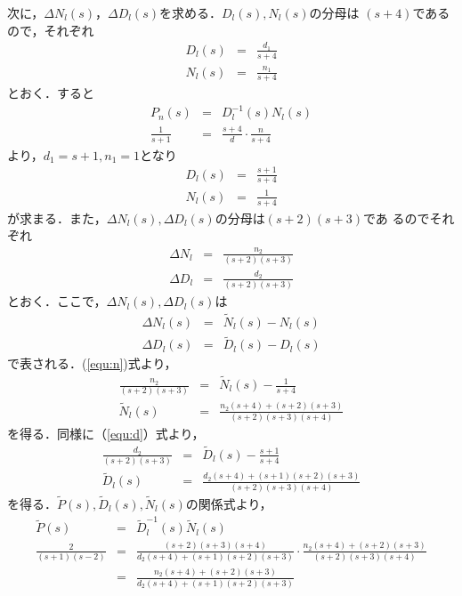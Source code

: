 \documentclass[a4paper,12pt]{jarticle}
\begin{document}
次に，$\Delta N_l(s)$，$\Delta D_l(s)$を求める．$D_l(s),N_l(s)$の分母は
$(s+4)$であるので，それぞれ
%
\begin{eqnarray}
 D_l(s)&=&\frac{d_1}{s+4} \\
 N_l(s)&=&\frac{n_1}{s+4}
\end{eqnarray}
%
とおく．すると
%
\begin{eqnarray}
 P_n(s) &=& D_l^{-1}(s)N_l(s) \\
 \frac{1}{s+1} &=& \frac{s+4}{d}\cdot \frac{n}{s+4} 
\end{eqnarray}
%
より，$d_1=s+1,n_1=1$となり
%
\begin{eqnarray}
 D_l(s) &=& \frac{s+1}{s+4} \\
 N_l(s) &=& \frac{1}{s+4}
\end{eqnarray}
%
が求まる．また，$\Delta N_l(s),\Delta D_l(s)$の分母は$(s+2)(s+3)$であ
るのでそれぞれ
%
\begin{eqnarray}
 \Delta N_l &=& \frac{n_2}{(s+2)(s+3)} \\
 \Delta D_l &=& \frac{d_2}{(s+2)(s+3)}
\end{eqnarray}
%
とおく．ここで，$\Delta N_l(s),\Delta D_l(s)$は
%
\begin{eqnarray}
 \Delta N_l(s) &=& \tilde{N}_l(s) -N_l(s) \label{equ:n} \\
 \Delta D_l(s) &=& \tilde{D}_l(s) -D_l(s) \label{equ:d}
\end{eqnarray}
%
で表される．(\ref{equ:n})式より，
%
\begin{eqnarray}
 \frac{n_2}{(s+2)(s+3)} &=& \tilde{N}_l(s) - \frac{1}{s+4} \nonumber \\
 \tilde{N}_l(s) &=& \frac{n_2(s+4)+(s+2)(s+3)}{(s+2)(s+3)(s+4)} 
\end{eqnarray}
%
を得る．同様に（\ref{equ:d}）式より，
%
\begin{eqnarray}
 \frac{d_2}{(s+2)(s+3)} &=& \tilde{D}_l(s) - \frac{s+1}{s+4} \nonumber \\
 \tilde{D}_l(s) &=& \frac{d_2(s+4)+(s+1)(s+2)(s+3)}{(s+2)(s+3)(s+4)} 
\end{eqnarray}
%
を得る．$\tilde{P}(s),\tilde{D}_l(s),\tilde{N}_l(s)$の関係式より，
%
\begin{eqnarray}
 \tilde{P}(s) &=& \tilde{D}_l^{-1}(s)\tilde{N}_l(s) \\
 \frac{2}{(s+1)(s-2)} &=&
  \frac{(s+2)(s+3)(s+4)}{d_2(s+4)+(s+1)(s+2)(s+3)} \cdot
  \frac{n_2(s+4)+(s+2)(s+3)}{(s+2)(s+3)(s+4)} \nonumber\\
 &=&\frac{n_2(s+4)+(s+2)(s+3)}{d_2(s+4)+(s+1)(s+2)(s+3)}
\end{eqnarray}
\end{document}
